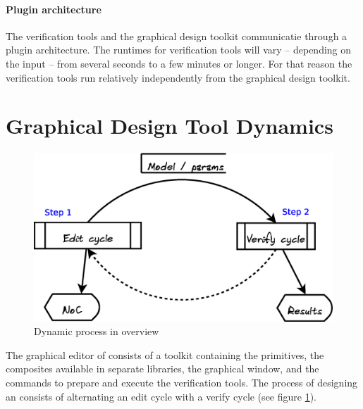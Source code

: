 \paragraph{Plugin architecture} The verification tools and the graphical 
design toolkit communicatie through a plugin architecture.
The runtimes for verification tools will vary -- depending on the input --
from several seconds to a few minutes or longer. For that reason the 
verification tools run relatively independently from the graphical 
design toolkit. 



\section{Graphical Design Tool Dynamics}

\pagedepth\maxdimen

\begin{figure}
	\includegraphics[width=.95\linewidth]{../architecture-dynamic-overview}
	\caption{Dynamic process in overview}
	\label{fig:overview-dynamic}
\end{figure}

The graphical editor of \Noc consists of a toolkit containing
the \xmas primitives, the composites available in separate 
libraries, the graphical window, and the commands to 
prepare and execute the verification tools. The process of 
designing an \Noc consists of alternating an edit cycle with a verify cycle 
(see figure \ref{fig:overview-dynamic}).

